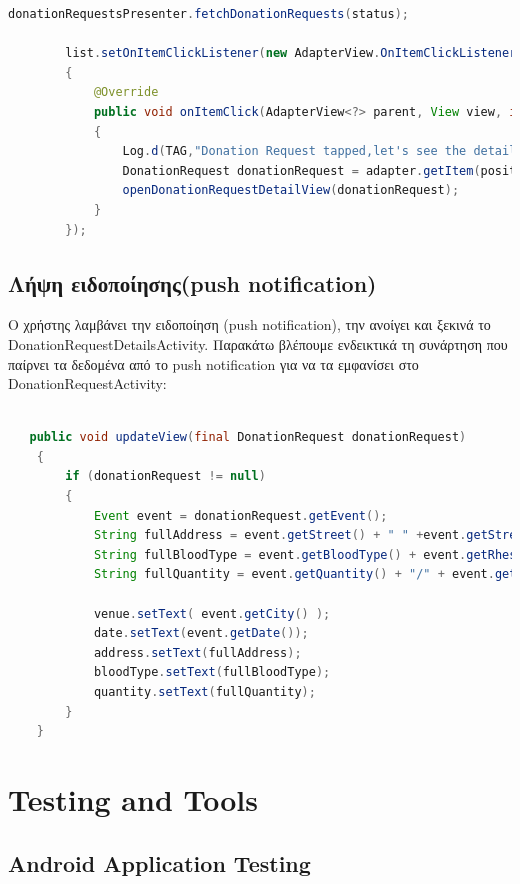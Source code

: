    			
   	\begin{lstlisting}[language=Java]			
        donationRequestsPresenter.fetchDonationRequests(status);

        list.setOnItemClickListener(new AdapterView.OnItemClickListener()
        {
            @Override
            public void onItemClick(AdapterView<?> parent, View view, int position, long id)
            {
                Log.d(TAG,"Donation Request tapped,let's see the details");
                DonationRequest donationRequest = adapter.getItem(position);
                openDonationRequestDetailView(donationRequest);
            }
        });
		\end{lstlisting}
	 	 
	\subsection{Λήψη ειδοποίησης(push notification)}	

		Ο χρήστης λαμβάνει την ειδοποίηση (push notification), την ανοίγει και ξεκινά το DonationRequestDetailsActivity. Παρακάτω βλέπουμε ενδεικτικά τη συνάρτηση που παίρνει τα δεδομένα από το push notification για να τα εμφανίσει στο DonationRequestActivity:
   			
   			
   	\begin{lstlisting}[language=Java]			
		
   public void updateView(final DonationRequest donationRequest)
    {
        if (donationRequest != null)
        {
            Event event = donationRequest.getEvent();
            String fullAddress = event.getStreet() + " " +event.getStreetNo();
            String fullBloodType = event.getBloodType() + event.getRhesus();
            String fullQuantity = event.getQuantity() + "/" + event.getQuantityRequired();

            venue.setText( event.getCity() );
            date.setText(event.getDate());
            address.setText(fullAddress);
            bloodType.setText(fullBloodType);
            quantity.setText(fullQuantity);
        }
    }
		\end{lstlisting}
	
	
		
	\section{Testing and Tools}
	
	\subsection{Android Application Testing}
	

